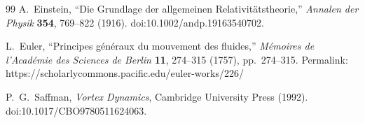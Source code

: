 \begin{thebibliography}{99}
A.~Einstein,
``Die Grundlage der allgemeinen Relativit\"atstheorie,''
\emph{Annalen der Physik} \textbf{354}, 769--822 (1916).
doi:10.1002/andp.19163540702.

L.~Euler,
``Principes g\'en\'eraux du mouvement des fluides,''
\emph{M\'emoires de l'Acad\'emie des Sciences de Berlin} \textbf{11}, 274--315 (1757), pp.~274--315.
Permalink: https://scholarlycommons.pacific.edu/euler-works/226/

P.~G.~Saffman,
\emph{Vortex Dynamics}, Cambridge University Press (1992).
doi:10.1017/CBO9780511624063.
\end{thebibliography}
